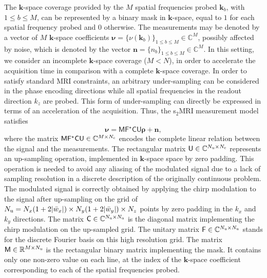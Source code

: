 \documentclass[10pt,draftcls, onecolumn]{IEEEtran}
\begin{document}
The $\bm{k}$-space coverage provided by the $M$ spatial frequencies probed $\bm{k}_b$, with $1\leq b\leq M$, can be represented by a binary mask in $\bm{k}$-space, equal to $1$ for each spatial frequency probed and $0$ otherwise. The measurements may be denoted by a vector of $M$ $\bm{k}$-space coefficients $\bm{\nu}=\{\nu(\bm{k}_b)\}_{1\leq b\leq M}\in\mathbb{C}^{M}$, possibly affected by noise, which is denoted by the vector $\bm{n}=\{n_b\}_{1\leq b\leq M}\in\mathbb{C}^{M}$. In this setting, we consider an incomplete $\bm{k}$-space coverage ($M<N$), in order to accelerate the acquisition time in comparison with a complete $\bm{k}$-space coverage. In order to satisfy standard MRI constraints, an arbitrary under-sampling can be considered in the phase encoding directions while all spatial frequencies in the readout direction $k_z$ are probed. This form of under-sampling can directly be expressed in terms of an acceleration of the acquisition. Thus, the s$_2$MRI measurement model satisfies
\begin{equation}
\label{mri2}
\bm{\nu}=\mathsf{MF^{\star}CU}\bm{\rho}+\bm{n},
\end{equation}
where the matrix $\mathsf{MF^{\star}CU}\in\mathbb{C}^{M\times N_{\rm c}}$ encodes the complete linear relation between the signal and the measurements. The rectangular matrix $\mathsf{U}\in\mathbb{C}^{N_{\rm u}\times N_{\rm c}}$ represents an up-sampling operation, implemented in $\bm k$-space space by zero padding. This operation is needed to avoid any aliasing of the modulated signal due to a lack of sampling resolution in a discrete description of the originally continuous problem. The modulated signal is correctly obtained by applying the chirp modulation to the signal after up-sampling on the grid of $N_{\rm u} = N_x(1+2\vert\bar{w}_x\vert)\times N_y(1+2\vert\bar{w}_y\vert)\times N_z$ points by zero padding in the $k_x$ and $k_y$ directions. The matrix $\mathsf{C}\in\mathbb{C}^{N_{\rm u}\times N_{\rm u}}$ is the diagonal matrix implementing the chirp modulation on the up-sampled grid. The unitary matrix $\mathsf{F}\in\mathbb{C}^{N_{\rm u}\times N_{\rm u}}$ stands for the discrete Fourier basis on this high resolution grid. The matrix $\mathsf{M}\in\mathbb{R}^{M\times N_{\rm u}}$ is the rectangular binary matrix implementing the mask. It contains only one non-zero value on each line, at the index of the $\bm k$-space coefficient corresponding to each of the spatial frequencies probed.
\end{document}
